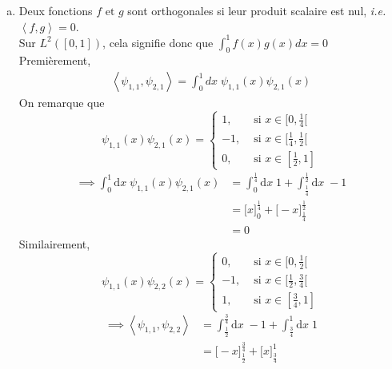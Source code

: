 \documentclass[letterpaper,12pt,oneside,final]{book}
\begin{document}
\begin{enumerate}[a)]

\item %
Deux fonctions \( f \text{ et } g \) sont orthogonales si leur produit scalaire est nul, \textit{i.e.} \( \left< f, g \right> =0 \).\\ 
Sur \( L^{2}\left( [0,1] \right)  \), cela signifie donc que \( \int_{0}^{1}f(x)g(x) dx = 0  \)
Premièrement, 
\begin{equation*}
\begin{split}
    \left< \psi_{1,1}, \psi_{2,1}\right>  = \int_{0}^{1} dx\; \psi_{1,1}(x)  \psi_{2,1}(x) 
\end{split}
\end{equation*}
On remarque que 
\[ \psi_{1,1}(x) \psi_{2,1}(x) = \begin{cases}
    1, & \text{ si } x\in [0, \frac{1}{4}[ \\ 
    -1, & \text{ si } x\in [\frac{1}{4},\frac{1}{2}[ \\ 
    0, & \text{ si } x\in [\frac{1}{2},1 ]
\end{cases} \]
\begin{equation*}
\begin{split}
    \implies \int_{0}^{1}\text{d}x\; \psi_{1,1}(x) \psi_{2,1}(x) &= \int_{0}^{\frac{1}{4}}\text{d}x\; 1 
+ \int_{\frac{1}{4}}^{\frac{1}{2}}\text{d}x\; -1\\ 
& = \big[x\big]_{0}^{\frac{1}{4}} + \big[-x\big]_{\frac{1}{4}}^{\frac{1}{2}}\\ 
& = 0
\end{split}
\end{equation*}
Similairement,
\begin{equation*}
    \psi_{1,1}(x)\psi_{2,2}(x) = \begin{cases}
        0, & \text{ si } x\in [0,\frac{1}{2}[\\ 
        -1, & \text{ si } x\in[\frac{1}{2},\frac{3}{4}[\\ 
        1, & \text{ si } x\in [\frac{3}{4},1]
    \end{cases}
\end{equation*}
\begin{equation*}
\begin{split}
    \implies \left<\psi_{1,1}, \psi_{2,2} \right> &= \int_{\frac{1}{2}}^{\frac{3}{4}}\text{d}x\; -1
+ \int_{\frac{3}{4}}^{1}\text{d}x\; 1 \\ 
& = \big[ -x \big]_{\frac{1}{2}}^{\frac{3}{4}}+ \big[x \big]_{\frac{3}{4}}^{1} \\ 

\end{split}
\end{equation*}
\end{enumerate}
\end{document}
